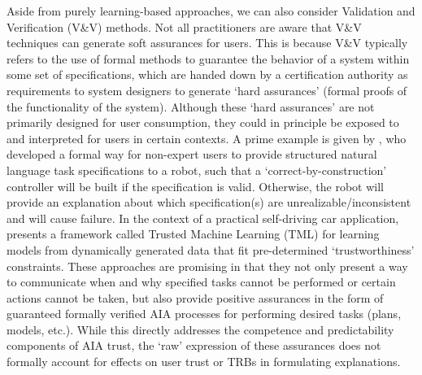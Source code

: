 Aside from purely learning-based approaches, we can also consider Validation and Verification (V\&V) methods. 
Not all practitioners are aware that V\&V techniques can generate soft assurances for users. 
This is because V\&V typically refers to the use of formal methods to guarantee the behavior of a system within some set of specifications, which are handed down by a certification authority as requirements to system designers to generate `hard assurances' (formal proofs of the functionality of the system). 
Although these `hard assurances' are not primarily designed for user consumption, they could in principle be exposed to and interpreted for users in certain contexts. 
A prime example is given by \citet{Raman2013-mz}, who developed a formal way for non-expert users to provide structured natural language task specifications to a robot, such that a `correct-by-construction' controller will be built if the specification is valid. 
Otherwise, the robot will provide an explanation about which specification(s) are unrealizable/inconsistent and will cause failure. 
In the context of a practical self-driving car application, \citet{Ghosh2016-dl} presents a framework called Trusted Machine Learning (TML) for learning models from dynamically generated data that fit pre-determined `trustworthiness' constraints. 
These approaches are promising in that they not only present a way to communicate when and why specified tasks cannot be performed or certain actions cannot be taken, but also provide positive assurances in the form of guaranteed formally verified AIA processes for performing desired tasks (plans, models, etc.). 
While this directly addresses the competence and predictability components of AIA trust, the `raw' expression of these assurances does not formally account for effects on user trust or TRBs in formulating explanations. %

